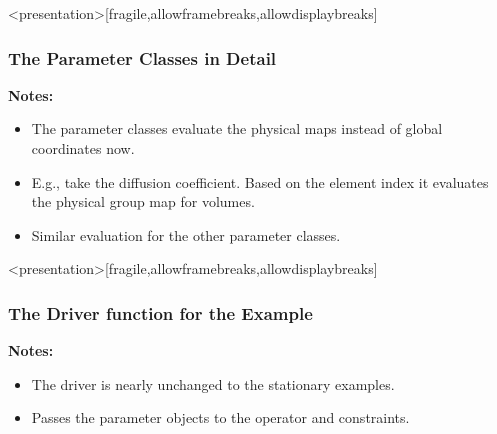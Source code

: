 \begin{frame}<presentation>[fragile,allowframebreaks,allowdisplaybreaks]
  \frametitle<presentation>{The Parameter Classes in Detail}
  
  \textbf{Notes:}
  \begin{itemize}
    \item The parameter classes evaluate the physical maps instead of global
      coordinates now.
    \item E.g., take the diffusion coefficient. Based on the element index
      it evaluates the physical group map for volumes.
    \item Similar evaluation for the other parameter classes.
  \end{itemize}
\end{frame}

\begin{frame}<presentation>[fragile,allowframebreaks,allowdisplaybreaks]
  \frametitle<presentation>{The Driver function for the Example}
  
  \textbf{Notes:}
  \begin{itemize}
    \item The driver is nearly unchanged to the stationary examples.
    \item Passes the parameter objects to the operator and constraints.
  \end{itemize}
\end{frame}

